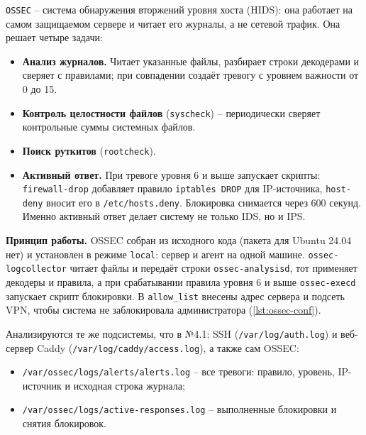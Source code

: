 
\texttt{OSSEC} -- система обнаружения вторжений уровня хоста (HIDS):
она работает на самом защищаемом сервере и читает его журналы, а не
сетевой трафик. Она решает четыре задачи:

\begin{itemize}
  \item \textbf{Анализ журналов.} Читает указанные файлы, разбирает
  строки декодерами и сверяет с правилами; при совпадении создаёт
  тревогу с уровнем важности от 0 до 15.
  \item \textbf{Контроль целостности файлов} (\texttt{syscheck}) --
  периодически сверяет контрольные суммы системных файлов.
  \item \textbf{Поиск руткитов} (\texttt{rootcheck}).
  \item \textbf{Активный ответ.} При тревоге уровня 6 и выше запускает
  скрипты: \texttt{firewall-drop} добавляет правило \texttt{iptables DROP}
  для IP-источника, \texttt{host-deny} вносит его в \texttt{/etc/hosts.deny}.
  Блокировка снимается через 600 секунд. Именно активный ответ делает
  систему не только IDS, но и IPS.
\end{itemize}

\textbf{Принцип работы.} OSSEC собран из исходного кода (пакета для
Ubuntu 24.04 нет) и установлен в режиме \texttt{local}: сервер и агент
на одной машине. \texttt{ossec-logcollector} читает файлы и передаёт строки
\texttt{ossec-analysisd}, тот применяет декодеры и правила, а при
срабатывании правила уровня 6 и выше \texttt{ossec-execd} запускает
скрипт блокировки. В \texttt{allow\_list} внесены адрес сервера и подсеть
VPN, чтобы система не заблокировала администратора
(\autoref{lst:ossec-conf}).



Анализируются те же подсистемы, что в №4.1: SSH
(\texttt{/var/log/auth.log}) и веб-сервер Caddy
(\texttt{/var/log/caddy/access.log}), а также сам OSSEC:

\begin{itemize}
  \item \texttt{/var/ossec/logs/alerts/alerts.log} -- все тревоги: правило,
  уровень, IP-источник и исходная строка журнала;
  \item \texttt{/var/ossec/logs/active-responses.log} -- выполненные
  блокировки и снятия блокировок.
\end{itemize}

